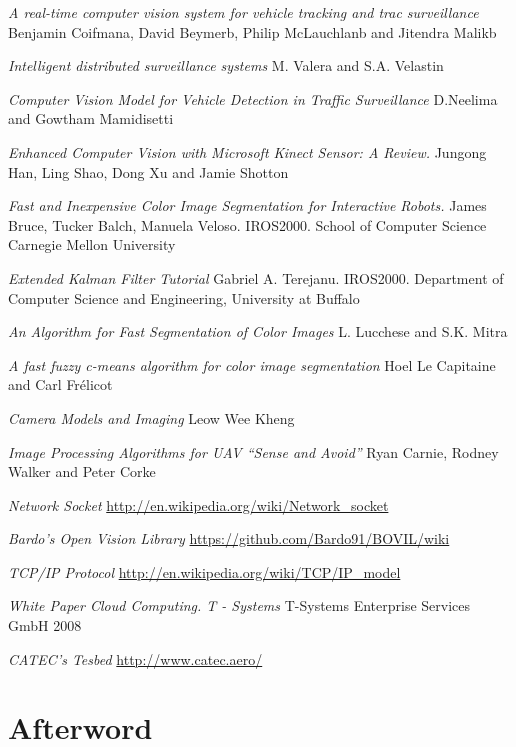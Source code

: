 \documentclass{book} %
\begin{document}
\begin{thebibliography}{9}

 \textit{A real-time computer vision system for vehicle tracking
and trac surveillance} Benjamin Coifmana, David Beymerb, Philip McLauchlanb and Jitendra Malikb

 \textit{Intelligent distributed surveillance systems} M. Valera and S.A. Velastin

 \textit{Computer Vision Model for Vehicle Detection in Traffic Surveillance} D.Neelima and Gowtham Mamidisetti

 \textit{Enhanced Computer Vision with Microsoft Kinect Sensor: A Review.} Jungong Han, Ling Shao, Dong Xu and Jamie Shotton

 \textit{Fast and Inexpensive Color Image Segmentation for Interactive Robots.} James Bruce, Tucker Balch, Manuela Veloso. IROS2000. School of Computer Science Carnegie Mellon University

 \textit{Extended Kalman Filter Tutorial} Gabriel A. Terejanu. IROS2000. Department of Computer Science and Engineering, University at Buffalo

 \textit{An Algorithm for Fast Segmentation of Color Images} L. Lucchese and S.K. Mitra

 \textit{A fast fuzzy c-means algorithm for color image segmentation} Hoel Le Capitaine and Carl Frélicot

 \textit{Camera Models and Imaging} Leow Wee Kheng

 \textit{Image Processing Algorithms for UAV “Sense and Avoid”}  Ryan Carnie, Rodney Walker and Peter Corke

 \textit{Network Socket} \url{http://en.wikipedia.org/wiki/Network_socket}

 \textit{Bardo's Open Vision Library} \url{https://github.com/Bardo91/BOVIL/wiki}

 \textit{TCP/IP Protocol}  \url{http://en.wikipedia.org/wiki/TCP/IP_model}

 \textit{White Paper Cloud Computing. T - Systems} T-Systems Enterprise Services GmbH 2008

 \textit {CATEC's Tesbed} \url{http://www.catec.aero/}
\end{thebibliography}

\backmatter

\chapter{Afterword}
\end{document}
